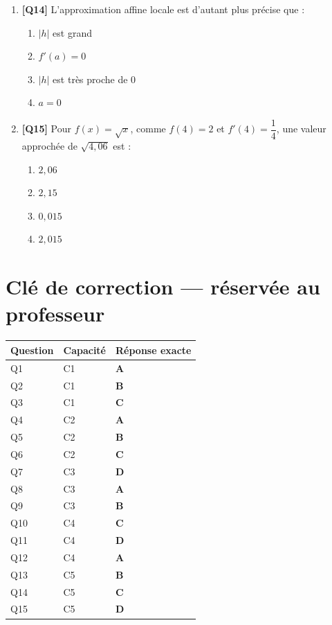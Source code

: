 \begin{enumerate}
\item \textbf{[Q14]} L'approximation affine locale est d'autant plus précise que :
  \begin{enumerate}[label=\Alph*.]
    \item $|h|$ est grand
    \item $f'(a) = 0$
    \item $|h|$ est très proche de 0
    \item $a = 0$
  \end{enumerate}

\item \textbf{[Q15]} Pour $f(x)=\sqrt{x}$, comme $f(4)=2$ et $f'(4)=\dfrac{1}{4}$, une valeur approchée de $\sqrt{4{,}06}$ est :
  \begin{enumerate}[label=\Alph*.]
    \item $2{,}06$
    \item $2{,}15$
    \item $0{,}015$
    \item $2{,}015$
  \end{enumerate}

\end{enumerate}

\ifnxVersionProfesseur
\clearpage
\section*{Clé de correction — réservée au professeur}

\begin{center}
\begin{tabular}{lll}
\hline
Question & Capacité & Réponse exacte \\
\hline
Q1 & C1 & \textbf{A} \\
Q2 & C1 & \textbf{B} \\
Q3 & C1 & \textbf{C} \\
Q4 & C2 & \textbf{A} \\
Q5 & C2 & \textbf{B} \\
Q6 & C2 & \textbf{C} \\
Q7 & C3 & \textbf{D} \\
Q8 & C3 & \textbf{A} \\
Q9 & C3 & \textbf{B} \\
Q10 & C4 & \textbf{C} \\
Q11 & C4 & \textbf{D} \\
Q12 & C4 & \textbf{A} \\
Q13 & C5 & \textbf{B} \\
Q14 & C5 & \textbf{C} \\
Q15 & C5 & \textbf{D} \\
\hline
\end{tabular}
\end{center}


